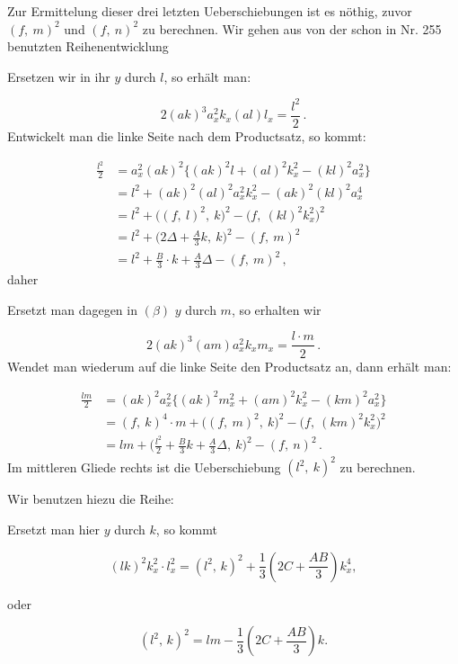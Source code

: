 Zur Ermittelung dieser drei letzten Ueberschiebungen ist es nöthig, zuvor
$(f,\ m)^2$ und $(f,\ n)^2$ zu berechnen. Wir gehen aus von der schon in
Nr. 255 benutzten Reihenentwicklung

Ersetzen wir in ihr $y$ durch $l$, so erhält man:

\[
2(ak)^3a_x^2k_x(al)l_x = \frac{l^2}{2}\,.
\]
Entwickelt man die linke Seite nach dem Productsatz, so kommt:

\[
\begin{aligned}
\frac{l^2}{2} &= a_x^2(ak)^2\big\{(ak)^2l+(al)^2k_x^2-(kl)^2a_x^2\big\}\\
&= l^2+(ak)^2(al)^2a_x^2k_x^2-(ak)^2(kl)^2a_x^4\\
&= l^2+\big((f,\ l)^2,\ k\big)^2-\big(f,\ (kl)^2k_x^2\big)^2\\
&= l^2+\Big(2\Delta+\frac{A}{3}k,\ k\Big)^2-(f,\ m)^2\\
&= l^2+\frac{B}{3}\cdot k+\frac{A}{3}\Delta-(f,\ m)^2\,,
\end{aligned}
\]
daher

Ersetzt man dagegen in $(\beta)$ $y$ durch $m$, so erhalten wir

\[
2(ak)^3(am)a_x^2k_xm_x = \frac{l\cdot m}{2}\,.
\]
Wendet man wiederum auf die linke Seite den Productsatz an, dann erhält man:

\[
\begin{aligned}
\frac{lm}{2} &= (ak)^2a_x^2\big\{(ak)^2m_x^2+(am)^2k_x^2-(km)^2a_x^2\big\}\\
&= (f,\ k)^4\cdot m + \big((f,\ m)^2,\ k\big)^2-\big(f,\ (km)^2k_x^2\big)^2\\
&= lm+\Big(\frac{l^2}{2}+\frac{B}{3}k+\frac{A}{3}\Delta,\ k\Big)^2-(f,\ n)^2\,.
\end{aligned}
\]
Im mittleren Gliede rechts ist die Ueberschiebung $(l^2,\ k)^2$ zu berechnen.



Wir benutzen hiezu die Reihe:

Ersetzt man hier $y$ durch $k$, so kommt

\[
(lk)^2 k_x^2 \cdot l_x^2 = (l^2,\, k)^2 + \frac{1}{3}\left(2C+\frac{AB}{3}\right)k_x^4,
\]

oder

\[
(l^2,\, k)^2 = lm - \frac{1}{3}\left(2C+\frac{AB}{3}\right)k.
\]

